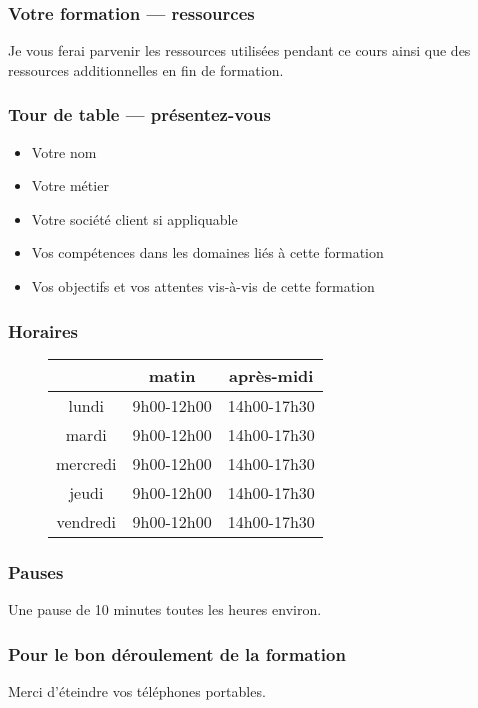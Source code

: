 \documentclass{formation}
\begin{document}
\begin{frame}
  \frametitle{Votre formation — ressources}

  Je vous ferai parvenir les ressources utilisées pendant ce cours
  ainsi que des ressources additionnelles en fin de formation.
\end{frame}

\begin{frame}
  \frametitle{Tour de table — présentez-vous}

  \begin{itemize}
  \item Votre nom
  \item Votre métier
  \item Votre société client si appliquable
  \item Vos compétences dans les domaines liés à cette formation
  \item Vos objectifs et vos attentes vis-à-vis de cette formation
  \end{itemize}
\end{frame}

\begin{frame}
  \frametitle{Horaires}
  \begin{figure}
    \centering
    \begin{tabular}{ccc}
      \toprule
               & matin            & après-midi        \\ \midrule
      lundi    & 9h00-12h00       & 14h00-17h30       \\
      mardi    & 9h00-12h00       & 14h00-17h30       \\
      mercredi & 9h00-12h00       & 14h00-17h30       \\
      jeudi    & 9h00-12h00       & 14h00-17h30       \\
      vendredi & 9h00-12h00       & 14h00-17h30       \\
      \bottomrule
    \end{tabular}
  \end{figure}
\end{frame}

\begin{frame}
  \frametitle{Pauses}
  Une pause de 10 minutes toutes les heures environ.
\end{frame}

\begin{frame}
  \frametitle{Pour le bon déroulement de la formation}
  Merci d'éteindre vos téléphones portables.
\end{frame}
\end{document}
